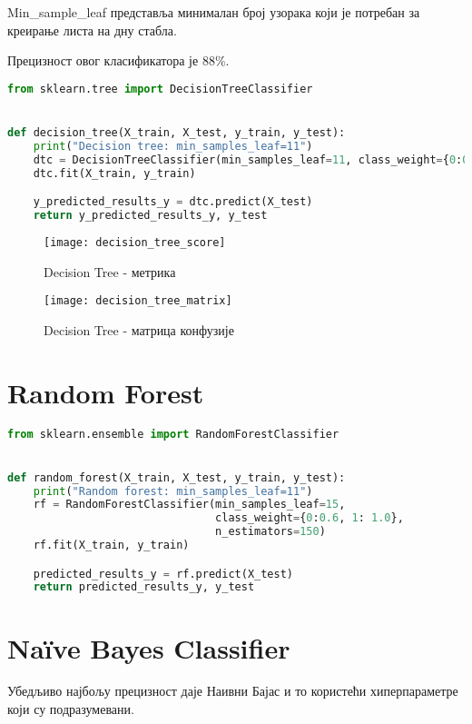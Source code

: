 \documentclass[11pt]{article} %
\begin{document}
Min\_sample\_leaf представља минималан број узорака који је потребан за креирање листа на дну стабла.

Прецизност овог класификатора је 88\%.

\begin{lstlisting}[language=Python,title=Пример 5. ]
from sklearn.tree import DecisionTreeClassifier


def decision_tree(X_train, X_test, y_train, y_test):
    print("Decision tree: min_samples_leaf=11")
    dtc = DecisionTreeClassifier(min_samples_leaf=11, class_weight={0:0.8, 1: 1.0})
    dtc.fit(X_train, y_train)

    y_predicted_results_y = dtc.predict(X_test)
    return y_predicted_results_y, y_test
\end{lstlisting}

\begin{figure}[h]
\centering
	\texttt{[image: decision\_tree\_score]} 
	\caption{Decision Tree - метрика} 
\end{figure}

\newpage


\begin{figure}[h]
\centering
	\texttt{[image: decision\_tree\_matrix]} 
	\caption{Decision Tree - матрица конфузије} 
\end{figure}


\section{Random Forest}

\begin{lstlisting}[language=Python,title=Пример 6. ]
from sklearn.ensemble import RandomForestClassifier


def random_forest(X_train, X_test, y_train, y_test):
    print("Random forest: min_samples_leaf=11")
    rf = RandomForestClassifier(min_samples_leaf=15,
                                class_weight={0:0.6, 1: 1.0},
                                n_estimators=150)
    rf.fit(X_train, y_train)

    predicted_results_y = rf.predict(X_test)
    return predicted_results_y, y_test


\end{lstlisting}

\section{Naïve Bayes Classifier}
Убедљиво најбољу прецизност даје Наивни Бајас и то користећи хиперпараметре који су подразумевани.
\end{document}

